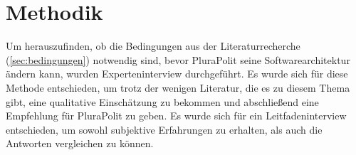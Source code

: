 \section{Methodik}
\label{sec:methodik}


Um herauszufinden, ob die Bedingungen aus der Literaturrecherche (\cref{sec:bedingungen}) notwendig sind, bevor PluraPolit seine Softwarearchitektur ändern kann, wurden Experteninterview durchgeführt. Es wurde sich für diese Methode entschieden, um trotz der wenigen Literatur, die es zu diesem Thema gibt, eine qualitative Einschätzung zu bekommen und abschließend eine Empfehlung für PluraPolit zu geben. Es wurde sich für ein Leitfadeninterview entschieden, um sowohl subjektive Erfahrungen zu erhalten, als auch die Antworten vergleichen zu können.







